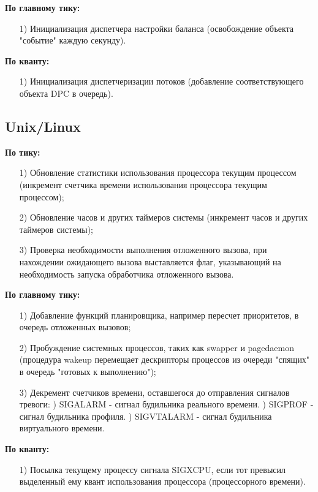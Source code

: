 \documentclass[14pt, a4paper]{extarticle}
\begin{document}
	\textbf{По главному тику:}
	\begin{itemize}
			\item[1)] Инициализация диспетчера настройки баланса (освобождение объекта "событие" каждую секунду).
	\end{itemize}
	
	\textbf{По кванту:}
	\begin{itemize}
		\item[1)] Инициализация диспетчеризации потоков (добавление соответствующего
		объекта DPC в очередь). 
	\end{itemize}

	\subsection{Unix/Linux}
	\textbf{По тику:}
	\begin{itemize}
		\item[1)] Обновление статистики использования процессора текущим процессом (инкремент счетчика времени использования процессора текущим процессом); 
		\item[2)] Обновление часов и других таймеров системы (инкремент часов и других таймеров системы); 
		\item[3)] Проверка необходимости выполнения отложенного вызова, при нахождении ожидающего вызова
		выставляется флаг, указывающий на необходимость запуска обработчика отложенного вызова.
	\end{itemize}
	
	\clearpage
	\textbf{По главному тику:}
	\begin{itemize}
		\item[1)] Добавление функций планировщика, например пересчет приоритетов, в очередь отложенных вызовов;
		\item[2)] Пробуждение системных процессов, таких как swapper и pagedaemon
		(процедура wakeup перемещает дескрипторы процессов из очереди "спящих" в очередь "готовых к выполнению");
		\item[3)] Декремент счетчиков времени, оставшегося до отправления сигналов тревоги:
			) SIGALARM - сигнал будильника реального времени.
			) SIGPROF - сигнал будильника профиля.
			) SIGVTALARM - сигнал будильника виртуального времени.
	\end{itemize}
	
	\textbf{По кванту:}
	\begin{itemize}
		\item[1)] Посылка текущему процессу сигнала SIGXCPU, если тот превысил
		выделенный ему квант использования процессора (процессорного
		времени).
	\end{itemize}
	 
\end{document}
